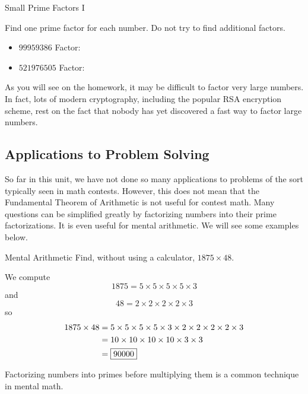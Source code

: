 \documentclass[a4paper,10pt]{report}
\begin{document}
\begin{problem}{Small Prime Factors I}

 Find one prime factor for each number. Do not try to find additional factors.

 \begin{itemize}
  \item $99959386$ \hfill Factor: 
  \item $521976505$ \hfill Factor: 
 \end{itemize}

\end{problem}

As you will see on the homework, it may be difficult to factor very large
numbers. In fact, lots of modern cryptography, including the popular RSA
encryption scheme, rest on the fact that nobody has yet discovered a fast way to
factor large numbers.

\subsection{Applications to Problem Solving}

So far in this unit, we have not done so many applications to problems of the
sort typically seen in math contests. However, this does not mean that the
Fundamental Theorem of Arithmetic is not useful for contest math. Many questions
can be simplified greatly by factorizing numbers into their prime
factorizations. It is even useful for mental arithmetic. We will see some
examples below.

\begin{problem}{Mental Arithmetic}
 Find, without using a calculator, $1875\times48$.

 \begin{solution}
  We compute \[
   1875 = 5 \times 5 \times 5 \times 5 \times 3
  \] and \[
   48 = 2 \times 2 \times 2 \times 2 \times 3
  \] so \begin{align*}
   1875 \times 48
   &= 5 \times 5 \times 5 \times 5 \times 3 \times 2 \times 2 \times 2 \times 2
   \times 3 \\
   &= 10 \times 10 \times 10 \times 10 \times 3 \times 3 \\
   &= \Ans{90000}
  \end{align*}

  Factorizing numbers into primes before multiplying them is a common technique
  in mental math.
 \end{solution}
\end{problem}
\end{document}
